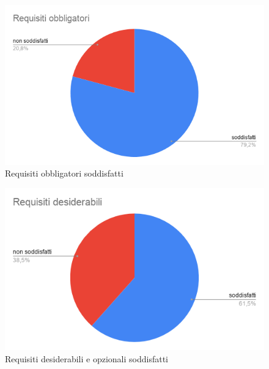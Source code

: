 \begin{figure}[H]
\centering
\includegraphics[scale=0.75]{img/grafici/Requisiti_obbligatori.png}
\caption{Requisiti obbligatori soddisfatti}
\end{figure}

\begin{figure}[H]
\centering
\includegraphics[scale=0.75]{img/grafici/Requisiti_desiderabili.png}
\caption{Requisiti desiderabili e opzionali soddisfatti}
\end{figure}